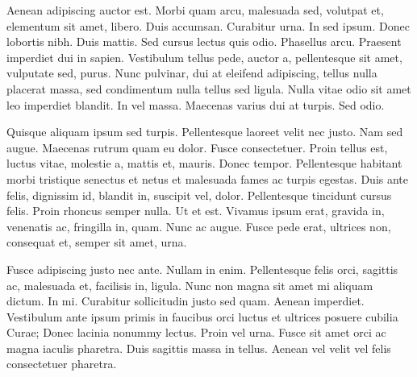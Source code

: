 \documentclass{article}
\begin{document}
Aenean adipiscing auctor est. Morbi quam arcu, malesuada sed, volutpat et,
elementum sit amet, libero. Duis accumsan. Curabitur urna. In sed ipsum. Donec
lobortis nibh. Duis mattis. Sed cursus lectus quis odio. Phasellus arcu.
Praesent imperdiet dui in sapien. Vestibulum tellus pede, auctor a,
pellentesque sit amet, vulputate sed, purus. Nunc pulvinar, dui at eleifend
adipiscing, tellus nulla placerat massa, sed condimentum nulla tellus sed
ligula. Nulla vitae odio sit amet leo imperdiet blandit. In vel massa. Maecenas
varius dui at turpis. Sed odio.

Quisque aliquam ipsum sed turpis. Pellentesque laoreet velit nec justo. Nam
sed augue. Maecenas rutrum quam eu dolor. Fusce consectetuer. Proin tellus est,
luctus vitae, molestie a, mattis et, mauris. Donec tempor. Pellentesque
habitant morbi tristique senectus et netus et malesuada fames ac turpis
egestas. Duis ante
felis, dignissim id, blandit in, suscipit vel, dolor. Pellentesque tincidunt cursus
felis. Proin rhoncus semper nulla. Ut et est. Vivamus ipsum erat, gravida in,
venenatis ac, fringilla in, quam. Nunc ac augue. Fusce pede erat, ultrices non,
consequat et, semper sit amet, urna.

Fusce adipiscing justo nec ante. Nullam in enim. Pellentesque felis orci,
sagittis ac, malesuada et, facilisis in, ligula. Nunc non magna sit amet mi
aliquam dictum. In mi. Curabitur sollicitudin justo sed quam. Aenean imperdiet.
Vestibulum ante ipsum primis in faucibus orci luctus et ultrices posuere
cubilia Curae; Donec lacinia nonummy lectus. Proin vel urna. Fusce sit amet
orci ac magna iaculis pharetra. Duis sagittis massa in tellus. Aenean vel velit
vel felis consectetuer pharetra.
\end{document}
